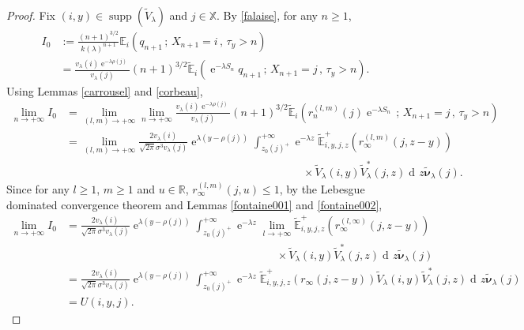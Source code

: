 \documentclass[12pt]{amsart}
\theoremstyle{definition}
\numberwithin{equation}{section}
\def\bb#1{\mathbb{#1}}
\def\tt#1{\tilde{#1}}
\def\tbs#1{\tilde{\boldsymbol{#1}}}
\def\tbb#1{\tilde{\mathbb{#1}}}
\def\geq{\geqslant}
\def\leq{\leqslant}
\renewcommand\ll{\lambda}
\DeclareMathOperator{\dd}{d\!}
\DeclareMathOperator{\e}{e}
\DeclareMathOperator{\supp}{supp}
\begin{document}
\begin{proof}
Fix $(i,y) \in \supp \left( \tt V_{\ll} \right)$ and $j \in \bb X$.  By \eqref{falaise}, for any $n \geq 1$,
\begin{align*}
I_0 &:= \frac{(n+1)^{3/2}}{k(\ll)^{n+1}} \bb E_i \left( q_{n+1} \,;\, X_{n+1} = i \,,\, \tau_y > n \right) \\
&= \frac{v_{\ll}(i)\e^{-\ll \rho(j)}}{v_{\ll}(j)} (n+1)^{3/2} \tbb E_i \left( \e^{-\ll S_n} q_{n+1} \,;\, X_{n+1} = j \,,\, \tau_y > n \right).
\end{align*}
Using Lemmas \ref{carrousel} and \ref{corbeau},
\begin{align*}
\lim_{n\to +\infty} I_0 &= \lim_{(l,m) \to +\infty} \lim_{n\to +\infty} \frac{v_{\ll}(i)\e^{-\ll \rho(j)}}{v_{\ll}(j)} (n+1)^{3/2} \tbb E_i \left( r_n^{(l,m)}(j) \e^{-\ll S_n}  \,;\, X_{n+1} = j \,,\, \tau_y > n \right) \\
&= \lim_{(l,m) \to +\infty} \frac{2 v_{\ll}(i)}{\sqrt{2\pi} \sigma^3v_{\ll}(j)} \e^{\ll (y - \rho(j))} \int_{z_0(j)^+}^{+\infty} \e^{-\ll z} \tbb E_{i,y,j,z}^+ \left( r_{\infty}^{(l,m)}(j,z-y) \right) \\
&\hspace{9cm} \times \tt V_{\ll}(i,y) \tt V_{\ll}^*(j,z) \dd z \tbs \nu_{\ll}(j).
\end{align*}
Since for any $l \geq 1$, $m \geq 1$ and $u \in \bb R$, $r_{\infty}^{(l,m)}(j,u) \leq 1$, by the Lebesgue dominated convergence theorem and Lemmas \ref{fontaine001} and \ref{fontaine002},
\begin{align*}
\lim_{n\to +\infty} I_0 &= \frac{2v_{\ll}(i)}{\sqrt{2\pi} \sigma^3v_{\ll}(j)} \e^{\ll (y-\rho(j))} \int_{z_0(j)^+}^{+\infty} \e^{-\ll z} \lim_{l \to +\infty} \tbb E_{i,y,j,z}^+ \left( r_{\infty}^{(l,\infty)}(j,z-y) \right) \\
&\hspace{8cm} \times \tt V_{\ll}(i,y) \tt V_{\ll}^*(j,z) \dd z \tbs \nu_{\ll}(j) \\
&= \frac{2v_{\ll}(i)}{\sqrt{2\pi} \sigma^3v_{\ll}(j)} \e^{\ll (y-\rho(j))} \int_{z_0(j)^+}^{+\infty} \e^{-\ll z} \tbb E_{i,y,j,z}^+ \left( r_{\infty}(j,z-y) \right)  \tt V_{\ll}(i,y) \tt V_{\ll}^*(j,z) \dd z \tbs \nu_{\ll}(j) \\
&= U(i,y,j).
\end{align*} 
\end{proof}
\end{document}
